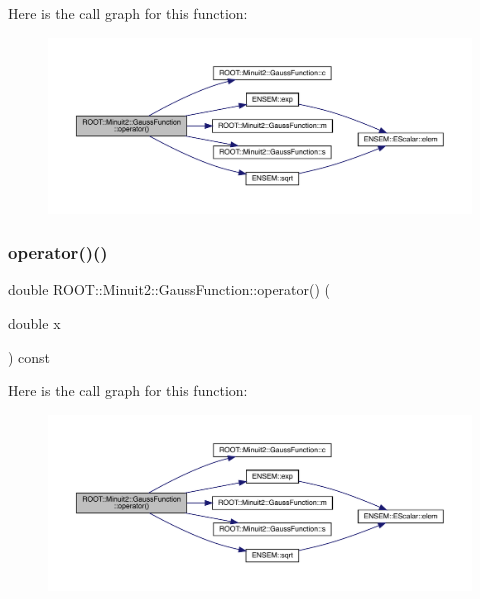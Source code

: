Here is the call graph for this function\+:
\nopagebreak
\begin{figure}[H]
\begin{center}
\leavevmode
\includegraphics[width=350pt]{d7/d62/classROOT_1_1Minuit2_1_1GaussFunction_a5fe07f3350b17d79583af7b844ded399_cgraph}
\end{center}
\end{figure}
\mbox{\label{classROOT_1_1Minuit2_1_1GaussFunction_a5fe07f3350b17d79583af7b844ded399}} 
\subsubsection{\texorpdfstring{operator()()}{operator()()}\hspace{0.1cm}{\footnotesize\ttfamily [2/2]}}
{\footnotesize\ttfamily double R\+O\+O\+T\+::\+Minuit2\+::\+Gauss\+Function\+::operator() (\begin{DoxyParamCaption}\item[{double}]{x }\end{DoxyParamCaption}) const\hspace{0.3cm}{\ttfamily [inline]}}

Here is the call graph for this function\+:
\nopagebreak
\begin{figure}[H]
\begin{center}
\leavevmode
\includegraphics[width=350pt]{d7/d62/classROOT_1_1Minuit2_1_1GaussFunction_a5fe07f3350b17d79583af7b844ded399_cgraph}
\end{center}
\end{figure}
\mbox{\label{classROOT_1_1Minuit2_1_1GaussFunction_aae78103bd6daf029fdb95d70185803e2}} 
